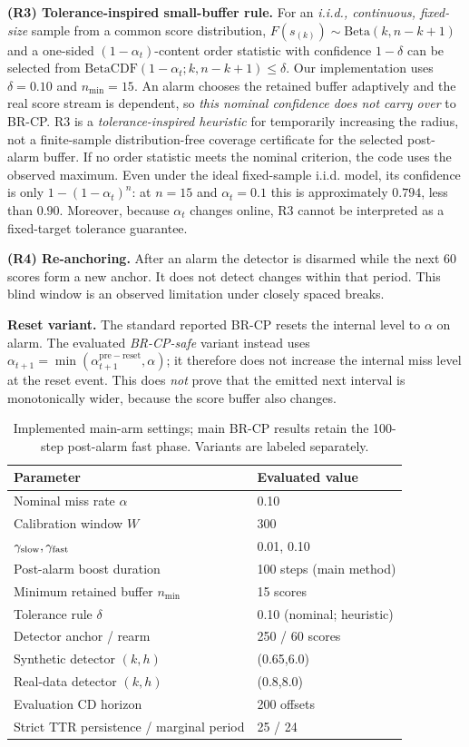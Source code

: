 \documentclass[10pt]{article}
\begin{document}
\textbf{(R3) Tolerance-inspired small-buffer rule.} For an \emph{i.i.d.,
continuous, fixed-size} sample from a common score distribution,
$F(s_{(k)})\sim\mathrm{Beta}(k,n-k+1)$ and a one-sided
$(1-\alpha_t)$-content order statistic with confidence $1-\delta$ can be
selected from $\mathrm{BetaCDF}(1-\alpha_t;k,n-k+1)\le\delta$.
Our implementation uses $\delta=0.10$ and $n_{\min}=15$.
An alarm chooses the retained buffer adaptively and the real score stream
is dependent, so \emph{this nominal confidence does not carry over} to
BR-CP. R3 is a \emph{tolerance-inspired heuristic} for temporarily
increasing the radius, not a finite-sample distribution-free coverage
certificate for the selected post-alarm buffer. If no order statistic meets
the nominal criterion, the code uses the observed maximum. Even under the
ideal fixed-sample i.i.d. model, its confidence is only
$1-(1-\alpha_t)^n$: at $n=15$ and $\alpha_t=0.1$ this is approximately
$0.794$, less than $0.90$. Moreover, because $\alpha_t$ changes online,
R3 cannot be interpreted as a fixed-target tolerance guarantee.

\textbf{(R4) Re-anchoring.} After an alarm the detector is disarmed
while the next $60$ scores form a new anchor. It does not detect changes
within that period. This blind window is an observed limitation under
closely spaced breaks.

\textbf{Reset variant.} The standard reported BR-CP resets the internal
level to $\alpha$ on alarm. The evaluated \emph{BR-CP-safe} variant instead
uses $\alpha_{t+1}=\min(\alpha_{t+1}^{\mathrm{pre-reset}},\alpha)$;
it therefore does not increase the internal miss level at the reset event.
This does \emph{not} prove that the emitted next interval is monotonically
wider, because the score buffer also changes.

\begin{table}[t]
\centering\small
\caption{Implemented main-arm settings; main BR-CP results retain the
100-step post-alarm fast phase. Variants are labeled separately.}
\label{tab:parameters}
\begin{tabular}{ll}
\toprule
Parameter & Evaluated value \\
\midrule
Nominal miss rate $\alpha$ & 0.10 \\
Calibration window $W$ & 300 \\
$\gamma_{\rm slow},\gamma_{\rm fast}$ & 0.01, 0.10 \\
Post-alarm boost duration & 100 steps (main method) \\
Minimum retained buffer $n_{\min}$ & 15 scores \\
Tolerance rule $\delta$ & 0.10 (nominal; heuristic) \\
Detector anchor / rearm & 250 / 60 scores \\
Synthetic detector $(k,h)$ & (0.65,6.0) \\
Real-data detector $(k,h)$ & (0.8,8.0) \\
Evaluation CD horizon & 200 offsets \\
Strict TTR persistence / marginal period & 25 / 24 \\
\bottomrule
\end{tabular}
\end{table}
\end{document}
